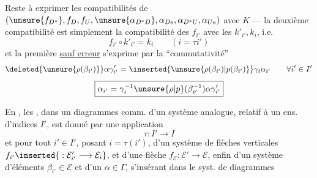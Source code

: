 Reste à exprimer les  compatibilités  de
$(\unsure{f_{D^*}},f_D,f_U,\unsure{\alpha_{D^*D}},\alpha_{De},\alpha_{D^*U},\alpha_{Ue})$
  avec $K$ --- la deuxième compatibilité est simplement la compatibilité des $f_{i'}$ avec les $k'_{i'},k_i$, i.e.
\[
f_{i'}\circ k'_{i'}=k_i\qquad(i=\tau i')
\]
et la première \uline{sauf erreur} s'exprime par la ``commutativité''
\[
\deleted{\unsure{\rho(\beta_{i'})}}\alpha\gamma'_{i'}
 =\inserted{\unsure{\rho(\beta_{i'})|p(\beta_{i'})}}\gamma_i\alpha_{i'}
 \qquad\forall i'\in I'
\]
\[
\boxed{\alpha_{i'}=\gamma_i^{-1}\unsure{\rho|p}(\beta_{i'}^{-1})\alpha\gamma'_{i'}}
\]

En , les , dans un   diagrammes comm.
d'un système analogue, relatif à un ens. d'indices $I'$, est donné par une application
\[
\tau:I'\longrightarrow I
\]
et pour tout $i'\in I'$, posant $i=\tau(i')$, d'un système de flèches verticales $f_{i'}\inserted{{}:\mathcal E'_{i'}\longrightarrow\mathcal E_i}$, et d'une flèche  $f_{\mathcal E}:\mathcal E'\longrightarrow\mathcal E$, enfin   d'un système d'éléments $\beta_{i'}\in\mathcal E$ et d'un $\alpha\in\Gamma$,  s'insérant dans le syst. de diagrammes
